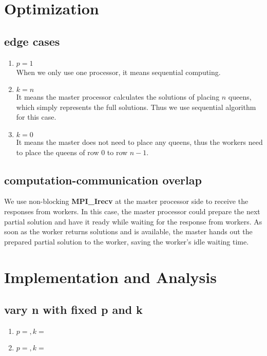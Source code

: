 \documentclass[twoside,12pt]{article}
\begin{document}
\section{Optimization}
\subsection{edge cases}
\begin{enumerate}
	\item $ p = 1 $ \\
	When we only use one processor, it means sequential computing. 
	\item $ k = n $ \\
	It means the master processor calculates the solutions of placing $ n $ queens, which simply represents the full solutions. Thus we use sequential algorithm for this case.	
	\item $ k = 0 $ \\
	It means the master does not need to place any queens, thus the workers need to place the queens of row $ 0 $ to row $ n-1 $.
		
\end{enumerate}

\subsection{computation-communication overlap}
We use non-blocking \textbf{MPI\_Irecv} at the master processor side to receive the responses from workers. In this case, the master processor could prepare the next partial solution and have it ready while waiting for the response from workers. As soon as the worker returns solutions and is available, the master hands out the prepared partial solution to the worker, saving the worker's idle waiting time. 


\section{Implementation and Analysis}
\subsection{vary n with fixed p and k}
\begin{enumerate}
	\item $ p = , k =  $ \\
	
	\item  $ p =  , k =  $ \\
\end{enumerate}
\end{document}
